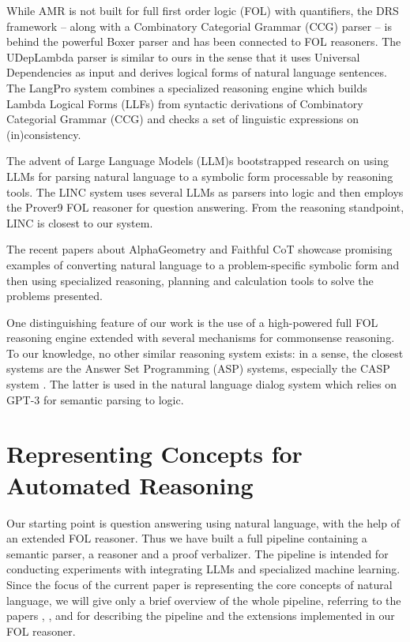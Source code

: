 \documentclass[runningheads]{llncs}
\begin{document}
While AMR is not built for full first order logic (FOL)
with quantifiers, the DRS framework -- along with
a Combinatory Categorial Grammar (CCG) parser --
is behind the powerful Boxer parser \cite{curran2007linguistically} and
has been connected to FOL reasoners. 
The UDepLambda parser \cite{reddy2017universal} is similar to ours in the 
sense that it uses Universal Dependencies \cite{de2021universal} as input and derives logical
forms of natural language sentences. The LangPro system \cite{abzianidze2017langpro}
combines a specialized reasoning engine which builds Lambda Logical Forms (LLFs)
from syntactic derivations of Combinatory Categorial Grammar (CCG) and
checks a set of linguistic expressions on (in)consistency.

The advent of Large Language Models (LLM)s bootstrapped research
on using LLMs for parsing natural language to a symbolic form
processable by reasoning tools. The LINC system \cite{olausson2023linc}
uses several LLMs as parsers into logic and then employs the Prover9
FOL reasoner \cite{mccune2005release} for question answering. From the
reasoning standpoint, LINC is closest to our system.

The recent papers about AlphaGeometry \cite{trinh2024solving}
and Faithful CoT \cite{lyu2023faithful} showcase promising
examples of converting natural language to a problem-specific symbolic form
and then using specialized reasoning, planning and calculation
tools to solve the problems presented.

One distinguishing feature of our work is the use of a high-powered
full FOL reasoning engine extended with several mechanisms for commonsense reasoning.
To our knowledge, no other similar reasoning system exists: in a sense, the
closest systems are the Answer Set Programming (ASP) systems, especially
the CASP system \cite{arias2018constraint}. The latter is used in the 
natural language dialog system \cite{gupta2023building} which
relies on GPT-3 for semantic parsing to logic.



\section{Representing Concepts for Automated Reasoning}

Our starting point is question answering using natural language, with the
help of an extended FOL reasoner. Thus we have built a full pipeline containing
a semantic parser, a reasoner and a proof verbalizer. The pipeline is intended for
conducting experiments with integrating LLMs and specialized machine learning.
Since the focus of the current paper is representing the core concepts of natural
language, we will give only a brief overview of the whole pipeline, referring to
the papers \cite{tammet2023experimental}, \cite{ref_confidences}, \cite{ref_exceptions} and 
\cite{ref_priit_2022} for describing the pipeline and the extensions implemented in our FOL reasoner.
\end{document}

